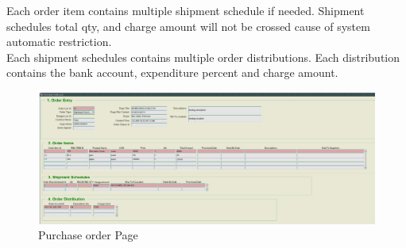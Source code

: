 \documentclass[12pt]{report} %
\begin{document}
Each order item contains multiple shipment schedule if needed. Shipment schedules total qty, and charge amount will not be crossed cause of system automatic restriction. \\

Each shipment schedules contains multiple order distributions. Each distribution contains the bank account, expenditure percent and charge amount.
\clearpage



\begin{landscape}
\begin{figure}[h]
	\begin{center}
	\includegraphics[width=1.35\textwidth]{pic/Pur_order_page.PNG}
	\end{center}
	\caption{Purchase order Page}
	\label{fig:Pur_order_page}
\end{figure}
\thispagestyle{empty} 
\end{landscape}
\clearpage
\end{document}
